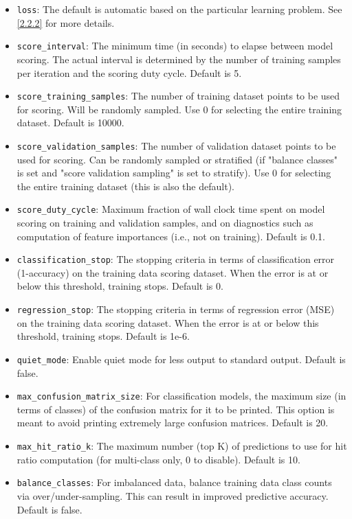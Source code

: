 \documentclass[11pt]{article}
\begin{document}
\begin{itemize}
\item \texttt{loss}: The default is automatic based on the particular learning problem. See \ref{2.2.2} for more details.
\item \texttt{score\_interval}: The minimum time (in seconds) to elapse between model scoring. The actual interval is determined by the number of training samples per iteration and the scoring duty cycle. Default is 5.
\item \texttt{score\_training\_samples}: The number of training dataset points to be used for scoring. Will be randomly sampled. Use 0 for selecting the entire training dataset. Default is 10000.
\item \texttt{score\_validation\_samples}: The number of validation dataset points to be used for scoring. Can be randomly sampled or stratified (if "balance classes" is set and "score validation sampling" is set to stratify). Use 0 for selecting the entire training dataset (this is also the default).
\item \texttt{score\_duty\_cycle}: Maximum fraction of wall clock time spent on model scoring on training and validation samples, and on diagnostics such as computation of feature importances (i.e., not on training). Default is 0.1.
\item \texttt{classification\_stop}: The stopping criteria in terms of classification error (1-accuracy) on the training data scoring dataset. When the error is at or below this threshold, training stops. Default is 0.
\item \texttt{regression\_stop}: The stopping criteria in terms of regression error (MSE) on the training data scoring dataset. When the error is at or below this threshold, training stops. Default is 1e-6.
\item \texttt{quiet\_mode}: Enable quiet mode for less output to standard output. Default is false.
\item \texttt{max\_confusion\_matrix\_size}: For classification models, the maximum size (in terms of classes) of the confusion matrix for it to be printed. This option is meant to avoid printing extremely large confusion matrices. Default is 20.
\item \texttt{max\_hit\_ratio\_k}: The maximum number (top K) of predictions to use for hit ratio computation (for multi-class only, 0 to disable). Default is 10.
\item \texttt{balance\_classes}: For imbalanced data, balance training data class counts via over/under-sampling. This can result in improved predictive accuracy. Default is false.

\end{itemize}
\end{document}
